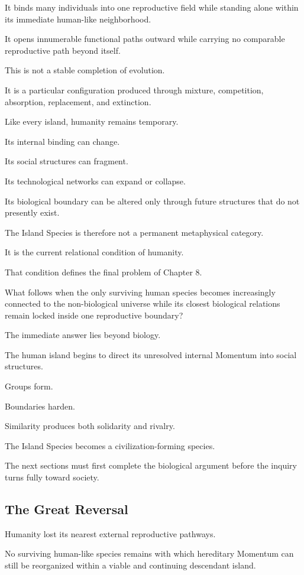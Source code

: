 It binds many individuals into one reproductive field while standing alone within its immediate human-like neighborhood.

It opens innumerable functional paths outward while carrying no comparable reproductive path beyond itself.

This is not a stable completion of evolution.

It is a particular configuration produced through mixture, competition, absorption, replacement, and extinction.

Like every island, humanity remains temporary.

Its internal binding can change.

Its social structures can fragment.

Its technological networks can expand or collapse.

Its biological boundary can be altered only through future structures that do not presently exist.

The Island Species is therefore not a permanent metaphysical category.

It is the current relational condition of humanity.

That condition defines the final problem of Chapter 8.

What follows when the only surviving human species becomes increasingly connected to the non-biological universe while its closest biological relations remain locked inside one reproductive boundary?

The immediate answer lies beyond biology.

The human island begins to direct its unresolved internal Momentum into social structures.

Groups form.

Boundaries harden.

Similarity produces both solidarity and rivalry.

The Island Species becomes a civilization-forming species.

The next sections must first complete the biological argument before the inquiry turns fully toward society.

\subsection*{\textbf{The Great Reversal}}

Humanity lost its nearest external reproductive pathways.

No surviving human-like species remains with which hereditary Momentum can still be reorganized within a viable and continuing descendant island.

